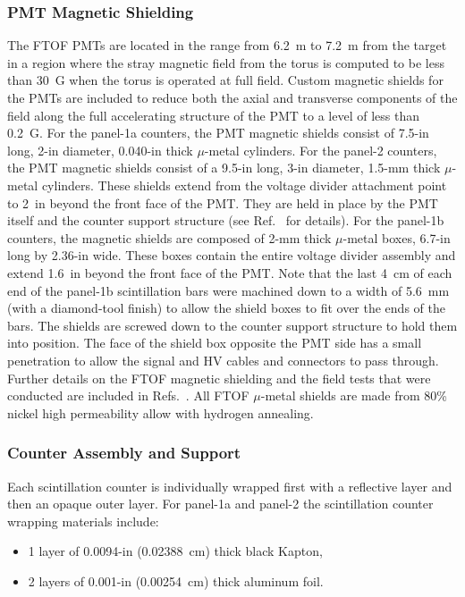 \documentclass{elsart}
\begin{document}
\subsubsection{PMT Magnetic Shielding}

The FTOF PMTs are located in the range from 6.2~m to 7.2~m from the target in a region where the
stray magnetic field from the torus is computed to be less than 30~G when the torus is operated at full
field. Custom magnetic shields for the PMTs are included to reduce both the axial and transverse
components of the field along the full accelerating structure of the PMT to a level of less than 0.2~G.
For the panel-1a counters, the PMT magnetic shields consist of 7.5-in long, 2-in diameter, 0.040-in thick
$\mu$-metal cylinders. For the panel-2 counters, the PMT magnetic shields consist of a 9.5-in long, 3-in
diameter, 1.5-mm thick $\mu$-metal cylinders. These shields extend from the voltage divider attachment
point to 2~in beyond the front face of the PMT. They are held in place by the PMT itself and the counter
support structure (see Ref.~\cite{tof-nim} for details).  For the panel-1b counters, the magnetic shields are
composed of 2-mm thick $\mu$-metal boxes, 6.7-in long by 2.36-in wide. These boxes contain the entire voltage
divider assembly and extend 1.6~in beyond the front face of the PMT. Note that the last 4~cm of each end of the
panel-1b scintillation bars were machined down to a width of 5.6~mm (with a diamond-tool finish) to allow the shield
boxes to fit over the ends of the bars. The shields are screwed down to the counter support structure to hold them
into position. The face of the shield box opposite the PMT side has a small penetration to allow the signal and HV
cables and connectors to pass through. Further details on the FTOF magnetic shielding and the field tests that were
conducted are included in Refs.~\cite{nim-p1b,ftof-shields}. All FTOF $\mu$-metal shields are made from 80\% nickel
high permeability allow with hydrogen annealing.

\subsubsection{Counter Assembly and Support}

Each scintillation counter is individually wrapped first with a reflective layer and then an opaque outer layer.
For panel-1a and panel-2 the scintillation counter wrapping materials include:

\begin{itemize}
\item 1 layer of 0.0094-in (0.02388~cm) thick black Kapton,
\item 2 layers of 0.001-in (0.00254~cm) thick aluminum foil.
\end{itemize}
\end{document}
